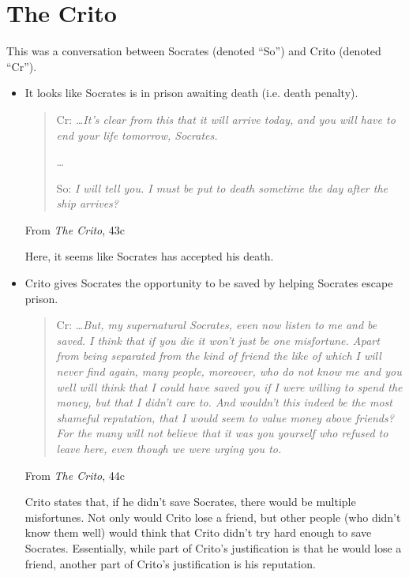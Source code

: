 \documentclass[letterpaper]{article}
\begin{document}
\section{The Crito}
This was a conversation between Socrates (denoted ``So'') and Crito (denoted ``Cr''). 

\begin{itemize}
    \item It looks like Socrates is in prison awaiting death (i.e. death penalty).
    \begin{mdframed}[]
        \begin{quotation}
            Cr: \emph{\dots It's clear from this that it will arrive today, and you will have to end your life tomorrow, Socrates.}

            \dots 

            So: \emph{I will tell you. I must be put to death sometime the day after the ship arrives?}
        \end{quotation}
        From \emph{The Crito}, 43c
    \end{mdframed}
    Here, it seems like Socrates has accepted his death. 

    \item Crito gives Socrates the opportunity to be saved by helping Socrates escape prison. 
    \begin{mdframed}[]
        \begin{quotation}
            Cr: \dots \emph{But, my supernatural Socrates, even now listen to me and be saved. I think that if you die it won't just be one misfortune. Apart from being separated from the kind of friend the like of which I will never find again, many people, moreover, who do not know me and you well will think that I could have saved you if I were willing to spend the money, but that I didn't care to. And wouldn't this indeed be the most shameful reputation, that I would seem to value money above friends? For the many will not believe that it was you yourself who refused to leave here, even though we were urging you to.}
        \end{quotation}
        From \emph{The Crito}, 44c
    \end{mdframed}
    Crito states that, if he didn't save Socrates, there would be multiple misfortunes. Not only would Crito lose a friend, but other people (who didn't know them well) would think that Crito didn't try hard enough to save Socrates. Essentially, while part of Crito's justification is that he would lose a friend, another part of Crito's justification is his reputation. 


\end{itemize}
\end{document}
